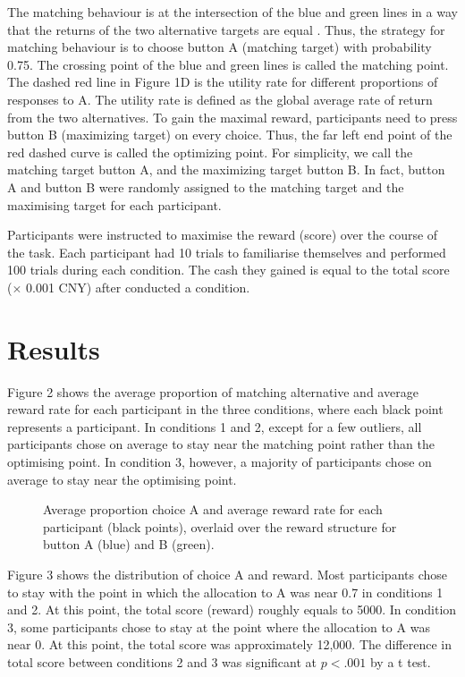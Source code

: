 \documentclass[twocolumn]{article}
\begin{document}
The matching behaviour is at the intersection of the blue and green
lines in a way that the returns of the two alternative targets are
equal \cite{RN26,RN27}. Thus, the strategy for matching behaviour is
to choose button A (matching target) with probability 0.75. The
crossing point of the blue and green lines is called the matching
point. The dashed red line in Figure 1D is the utility rate for
different proportions of responses to A. The utility rate is defined
as the global average rate of return from the two alternatives. To
gain the maximal reward, participants need to press button B
(maximizing target) on every choice. Thus, the far left end point of
the red dashed curve is called the optimizing point. For simplicity,
we call the matching target button A, and the maximizing target button
B. In fact, button A and button B were randomly assigned to the
matching target and the maximising target for each participant.

Participants were instructed to maximise the reward (score) over the
course of the task. Each participant had 10 trials to familiarise
themselves and performed 100 trials during each condition. The cash
they gained is equal to the total score ($\times$ 0.001 CNY) after
conducted a condition.

\section{Results}

Figure 2 shows the average proportion of matching alternative and
average reward rate for each participant in the three conditions,
where each black point represents a participant. In conditions 1 and
2, except for a few outliers, all participants chose on average to
stay near the matching point rather than the optimising point. In
condition 3, however, a majority of participants chose on average to
stay near the optimising point.

\begin{figure}[t!]
\caption{Average proportion choice A and average reward rate for each participant (black points), overlaid over the reward structure for button A (blue) and B (green).}
\end{figure}

Figure 3 shows the distribution of choice A and reward. Most
participants chose to stay with the point in which the allocation to A
was near 0.7 in conditions 1 and 2. At this point, the total score
(reward) roughly equals to 5000. In condition 3, some participants
chose to stay at the point where the allocation to A was near 0. At
this point, the total score was approximately 12,000. The difference
in total score between conditions 2 and 3 was significant at $p<.001$
by a t test.
\end{document}
